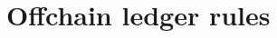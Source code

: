 \documentclass[../hydrozoa.tex]{subfiles}
\begin{document}
\section{Offchain ledger rules}%
\label{h:offchain-ledger-rules}

\end{document}
